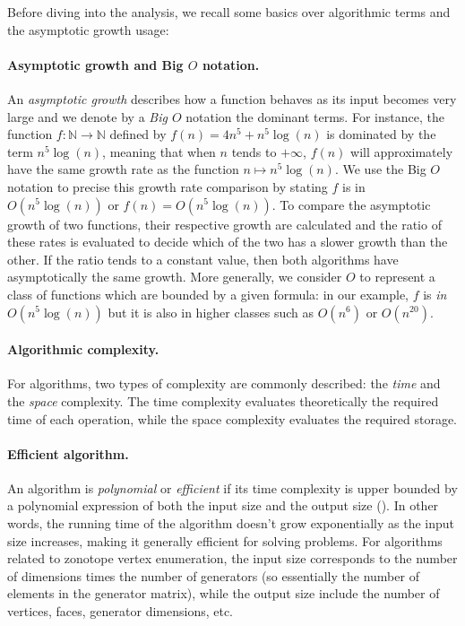 Before diving into the analysis, we recall some basics over algorithmic terms and the asymptotic growth usage:


\paragraph*{Asymptotic growth and Big $O$ notation.}
An \emph{asymptotic growth} describes how a function behaves as its input becomes very large and we denote by a \emph{Big $O$} notation the dominant terms. For instance, the function $f\colon \mathbb{N} \rightarrow \mathbb{N}$ defined by $f(n) = 4n^5 + n^5\log (n)$ is dominated by the term $n^5\log(n)$, meaning that when $n$ tends to $+\infty$, $f(n)$ will approximately have the same growth rate as the function $n\mapsto n^5\log(n)$. We use the Big $O$ notation to precise this growth rate comparison by stating $f$ is in $O(n^5\log(n))$ or $f(n) = O(n^5\log(n))$. To compare the asymptotic growth of two functions, their respective growth are calculated and the ratio of these rates is evaluated to decide which of the two has a slower growth than the other. If the ratio tends to a constant value, then both algorithms have asymptotically the same growth. More generally, we consider $O$ to represent a class of functions which are bounded by a given formula: in our example, $f$ is \emph{in} $O(n^5\log(n))$ but it is also in higher classes such as $O(n^6)$ or $O(n^{20})$.

\paragraph*{Algorithmic complexity.} For algorithms, two types of complexity are commonly described: the \emph{time} and the \emph{space} complexity. The time complexity evaluates theoretically the required time of each operation, while the space complexity evaluates the required storage. 

\paragraph*{Efficient algorithm.}
An algorithm is \emph{polynomial} or \emph{efficient} if its time complexity is upper bounded by a polynomial expression of both the input size and the output size (\cite{fukudaZonotopeConstructionMinkowski2004a}).  In other words, the running time of the algorithm doesn't grow exponentially as the input size increases, making it generally efficient for solving problems. For algorithms related to zonotope vertex enumeration, the input size corresponds to the number of dimensions times the number of generators (so essentially the number of elements in the generator matrix), while the output size include the number of vertices, faces, generator dimensions, etc.

